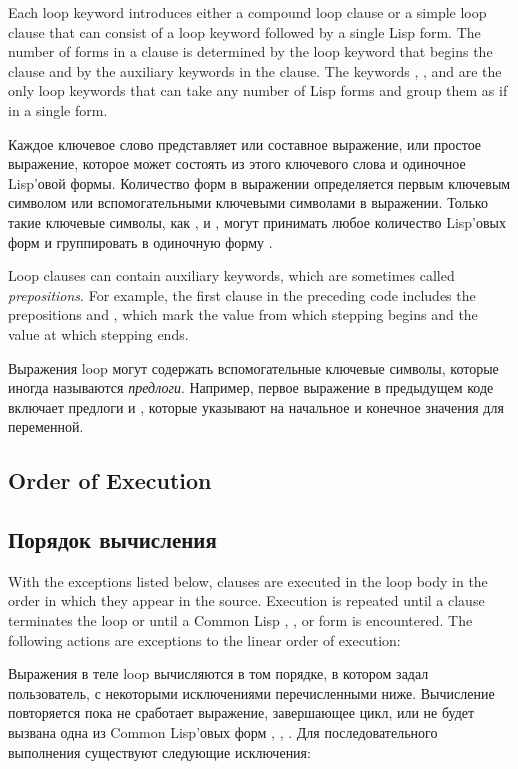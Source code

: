 Each loop keyword introduces either a compound loop clause or a simple
loop clause that can consist of a loop keyword followed by a single
Lisp form.  The number of forms in a clause is determined by the loop
keyword that begins the clause and by the auxiliary keywords in the
clause.  The keywords , , and  are
the only loop keywords that can take any number of Lisp forms and
group them as if in a single  form.

Каждое ключевое слово представляет или составное выражение, или
простое выражение, которое может состоять из этого ключевого слова и
одиночное Lisp'овой формы. Количество форм в выражении определяется
первым ключевым символом или вспомогательными ключевыми символами в
выражении. Только такие ключевые символы, как ,
 и , могут принимать любое количество
Lisp'овых форм и группировать в одиночную форму .

Loop clauses can contain auxiliary keywords, which are sometimes
called \emph{prepositions}.  For example, the first clause in the
preceding code includes the prepositions  and ,
which mark the value from which stepping begins and the value at which
stepping ends.

Выражения loop могут содержать вспомогательные ключевые символы,
которые иногда называются \emph{предлоги}. Например, первое выражение
в предыдущем коде включает предлоги  и , которые
указывают на начальное и конечное значения для переменной.

\subsection{Order of Execution}

\subsection{Порядок вычисления}

With the exceptions listed below, clauses are executed in the loop
body in the order in which they appear in the source.  Execution is
repeated until a clause terminates the loop or until a Common Lisp
, , or  form is encountered.  The
following actions are exceptions to the linear order of execution:

Выражения в теле loop вычисляются в том порядке, в котором задал
пользователь, с некоторыми исключениями перечисленными
ниже. Вычисление повторяется пока не сработает выражение, завершающее
цикл, или не будет вызвана одна из Common Lisp'овых форм ,
, . Для последовательного выполнения существуют
следующие исключения:

